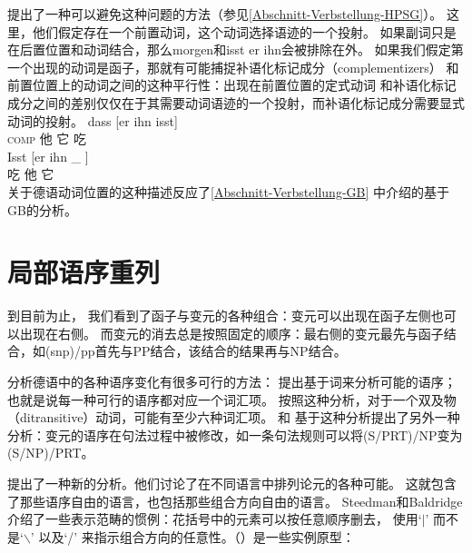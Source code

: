 \zl
 \citet{KW91a}提出了一种可以避免这种问题的方法（参见\ref{Abschnitt-Verbstellung-HPSG}）。
这里，他们假定存在一个前置动词，这个动词选择语迹的一个投射。
如果副词只是在后置位置和动词结合，那么morgen和isst er ihn会被排除在外。
如果我们假定第一个出现的动词是函子，那就有可能捕捉补语化标记成分（complementizers）
和前置位置上的动词之间的这种平行性\citep{Hoehle97a}：出现在前置位置的定式动词
和补语化标记成分之间的差别仅仅在于其需要动词语迹的一个投射，而补语化标记成分需要显式动词的投射。
\eal
\ex 
\gll dass [er ihn isst]\\
     \textsc{comp} \spacebr{}他 它 吃\\
\ex 
\gll Isst [er ihn \_ ]\\
     吃 \spacebr{}他 它 \\
\zl
关于德语动词位置的这种描述反应了\ref{Abschnitt-Verbstellung-GB}
中介绍的基于GB的分析。

\section{局部语序重列}
\label{Abschnitt-CG-lokale-Umstellung}

到目前为止，
我们看到了函子与变元的各种组合：变元可以出现在函子左侧也可以出现在右侧。
而变元的消去总是按照固定的顺序：最右侧的变元最先与函子结合，如(s\bs np)/pp首先与PP结合，该结合的结果再与NP结合。 

分析德语中的各种语序变化有很多可行的方法：
 \citet{Uszkoreit86b}提出基于词来分析可能的语序；也就是说每一种可行的语序都对应一个词汇项。
按照这种分析，对于一个双及物（ditransitive）动词，可能有至少六种词汇项。
 \citet[]{Briscoe2000a}和 \citet[--98]{Villavicencio2002a}基于这种分析提出了另外一种分析：变元的语序在句法过程中被修改，如一条句法规则可以将(S/PRT)/NP变为(S/NP)/PRT。

 \citet{SB2006a-u}提出了一种新的分析。他们讨论了在不同语言中排列论元的各种可能。
这就包含了那些语序自由的语言，也包括那些组合方向自由的语言。
Steedman和Baldridge介绍了一些表示范畴的惯例：花括号中的元素可以按任意顺序删去，
使用`$|$'
\isc{$\vert$}\is{$\vert$}而不是`$\backslash$'
\isc{$\backslash$}\is{$\backslash$}以及`/'
\isc{/}\is{/}来指示组合方向的任意性。（）是一些实例原型：

